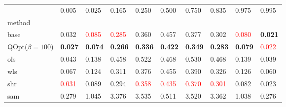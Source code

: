 \begin{tabular}{llllllllll}
\toprule
 & 0.005 & 0.025 & 0.165 & 0.250 & 0.500 & 0.750 & 0.835 & 0.975 & 0.995 \\
method &  &  &  &  &  &  &  &  &  \\
\midrule
base & 0.032 & \textcolor{red}{0.085} & \textcolor{red}{0.285} & 0.360 & 0.457 & 0.377 & 0.302 & \textcolor{red}{0.080} & \textbf{0.021} \\
\midrule
QOpt($\beta=100$) & \textbf{0.027} & \textbf{0.074} & \textbf{0.266} & \textbf{0.336} & \textbf{0.422} & \textbf{0.349} & \textbf{0.283} & \textbf{0.079} & \textcolor{red}{0.022} \\
ols & 0.043 & 0.138 & 0.458 & 0.522 & 0.468 & 0.530 & 0.468 & 0.139 & 0.039 \\
wls & 0.067 & 0.124 & 0.311 & 0.376 & 0.455 & 0.390 & 0.326 & 0.126 & 0.060 \\
shr & \textcolor{red}{0.031} & 0.089 & 0.294 & \textcolor{red}{0.358} & \textcolor{red}{0.435} & \textcolor{red}{0.370} & \textcolor{red}{0.301} & 0.082 & 0.023 \\
sam & 0.279 & 1.045 & 3.376 & 3.535 & 0.511 & 3.520 & 3.362 & 1.038 & 0.276 \\
\bottomrule
\end{tabular}